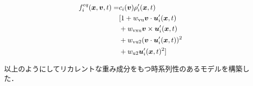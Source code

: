 \begin{equation}
\begin{split}
  f_i^{eq}(\bm{x}, \bm{v}, t) =
  &c_i(\bm{v}) \rho_i'(\bm{x}, t) \\
  &[ 1 + w_{\rm{vu}}\bm{v} \cdot \bm{u}_i'(\bm{x}, t) \\
  &+ w_{\rm{vxu}}\bm{v} \times \bm{u}_i'(\bm{x}, t) \\
  &+ w_{\rm{vu2}}(\bm{v} \cdot \bm{u}_i'(\bm{x}, t))^2 \\
  &+ w_{\rm{u2}}\bm{u}_i'(\bm{x}, t)^2 ]
\end{split}
  \label{eq:weighted-equilibrium-time-series}
\end{equation}

以上のようにしてリカレントな重み成分をもつ時系列性のあるモデルを構築した．
